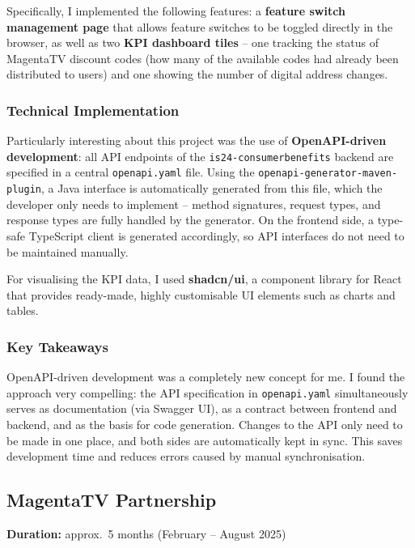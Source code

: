 \documentclass[a4paper, 12pt]{article}
\begin{document}
Specifically, I implemented the following features: a \textbf{feature switch management
page} that allows feature switches to be toggled directly in the browser, as well as
two \textbf{KPI dashboard tiles} -- one tracking the status of MagentaTV discount codes
(how many of the available codes had already been distributed to users) and one showing
the number of digital address changes.

\subsubsection*{Technical Implementation}

Particularly interesting about this project was the use of \textbf{OpenAPI-driven
development}: all API endpoints of the \texttt{is24-consumerbenefits} backend are
specified in a central \texttt{openapi.yaml} file. Using the
\texttt{openapi-generator-maven-plugin}, a Java interface is automatically generated
from this file, which the developer only needs to implement -- method signatures,
request types, and response types are fully handled by the generator. On the frontend
side, a type-safe TypeScript client is generated accordingly, so API interfaces do not
need to be maintained manually.

For visualising the KPI data, I used \textbf{shadcn/ui}, a component library for React
that provides ready-made, highly customisable UI elements such as charts and tables.

\subsubsection*{Key Takeaways}

OpenAPI-driven development was a completely new concept for me. I found the approach
very compelling: the API specification in \texttt{openapi.yaml} simultaneously serves
as documentation (via Swagger UI), as a contract between frontend and backend, and as
the basis for code generation. Changes to the API only need to be made in one place,
and both sides are automatically kept in sync. This saves development time and reduces
errors caused by manual synchronisation.

\subsection{MagentaTV Partnership}

\noindent\textbf{Duration:} approx.\ 5 months (February -- August 2025)
\end{document}
